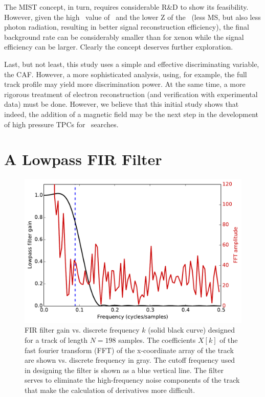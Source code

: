 \documentclass{JINST}
\begin{document}
The MIST concept, in turn, requires considerable R\&D to show its feasibility. However, given the high \Qbb\ value of \SE\ and the lower Z of the \SEHF\ (less MS, but also less photon radiation, resulting in better signal reconstruction efficiency), the final background rate can be considerably smaller than for xenon while the signal efficiency can be larger. Clearly the concept deserves further exploration. 

Last, but not least, this study uses a simple and effective discriminating variable, the CAF. However, a more sophisticated analysis, using, for example, the full track profile may yield more discrimination power. At the same time, a more rigorous treatment of electron reconstruction (and verification with experimental data) must be done. However, we believe that this initial study shows that indeed, the addition of a magnetic field may be the next step in the development of high pressure TPCs for \bbonu\ searches. 

\appendix

\section{A Lowpass FIR Filter}\label{app:FIR}


\begin{figure}[!htb]
	\centering
	\includegraphics[scale=0.6]{fig/FIR_freq_resp_nmagse2_6.pdf}
	\caption{\label{fig_FIR}FIR filter gain vs. discrete frequency $k$ (solid black curve) designed for a track of length $N = 198$ samples.  The coefficients $X[k]$ of the fast fourier transform (FFT) of the x-coordinate array of the track are shown vs. discrete frequency in gray.  The cutoff frequency used in designing the filter is shown as a blue vertical line.  The filter serves to eliminate the high-frequency noise components of the track that make the calculation of derivatives more difficult.}
\end{figure}
\end{document}
